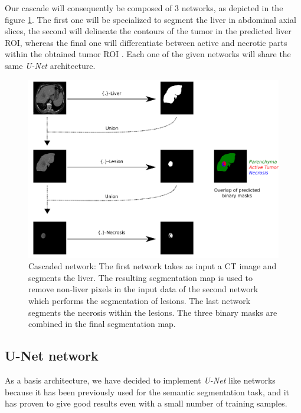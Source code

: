 \documentclass[]{article}
\begin{document}
	Our cascade will consequently be composed of 3 networks, as depicted
	in the figure \ref{CARS_Cascade}. The first one will be specialized to segment the liver in
	abdominal axial slices, the second will delineate the contours of the
	tumor in the predicted liver ROI, whereas the final one will
	differentiate between active and necrotic parts within the obtained
	tumor ROI \cite{Ouhmich2019}.
	Each one of the given networks will share the same \emph{U-Net}
	architecture.
	
	\begin{figure}[th!]
		\centering
		\includegraphics[width=0.7\linewidth]{images/image26}
		\caption{Cascaded network: The first network takes as input a CT image and segments the liver. The resulting segmentation map is used to remove non-liver pixels in the input data of the second network which performs the segmentation of lesions. The last network segments the necrosis within the lesions. The three binary masks are combined in the final segmentation map.}
		\label{CARS_Cascade}
	\end{figure}
	
	
	\subsection*{U-Net network}
	
	As a basis architecture, we have decided to implement \emph{U-Net} like
	networks because it has been previously used for the semantic
	segmentation task, and it has proven to give good results even with a
	small number of training samples.
	
\end{document}
